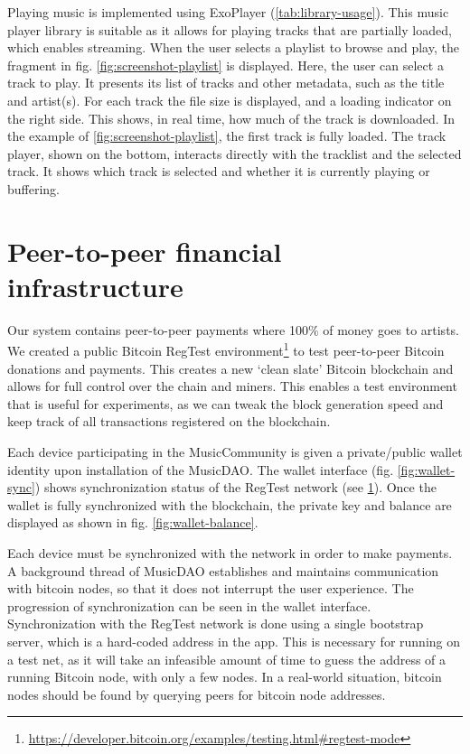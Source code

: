 Playing music is implemented using ExoPlayer (\ref{tab:library-usage}). This music player library is suitable as it allows for playing tracks that are partially loaded, which enables streaming. When the user selects a playlist to browse and play, the fragment in fig. \ref{fig:screenshot-playlist} is displayed. Here, the user can select a track to play. It presents its list of tracks and other metadata, such as the title and artist(s). For each track the file size is displayed, and a loading indicator on the right side. This shows, in real time, how much of the track is downloaded. In the example of \ref{fig:screenshot-playlist}, the first track is fully loaded. The track player, shown on the bottom, interacts directly with the tracklist and the selected track. It shows which track is selected and whether it is currently playing or buffering. 

\section{Peer-to-peer financial infrastructure}
\label{sec:regtest-network-impl}
Our system contains peer-to-peer payments where 100\% of money goes to artists. We created a public Bitcoin RegTest environment\footnote{\url{https://developer.bitcoin.org/examples/testing.html\#regtest-mode}} to test peer-to-peer Bitcoin donations and payments. This creates a new `clean slate' Bitcoin blockchain and allows for full control over the chain and miners. This enables a test environment that is useful for experiments, as we can tweak the block generation speed and keep track of all transactions registered on the blockchain.

Each device participating in the MusicCommunity is given a private/public wallet identity upon installation of the MusicDAO. The wallet interface (fig. \ref{fig:wallet-sync}) shows synchronization status of the RegTest network (see \ref{sec:regtest-network-impl}). Once the wallet is fully synchronized with the blockchain, the private key and balance are displayed as shown in fig. \ref{fig:wallet-balance}. 

Each device must be synchronized with the network in order to make payments. A background thread of MusicDAO establishes and maintains communication with bitcoin nodes, so that it does not interrupt the user experience. The progression of synchronization can be seen in the wallet interface. Synchronization with the RegTest network is done using a single bootstrap server, which is a hard-coded address in the app. This is necessary for running on a test net, as it will take an infeasible amount of time to guess the address of a running Bitcoin node, with only a few nodes. In a real-world situation, bitcoin nodes should be found by querying peers for bitcoin node addresses.

